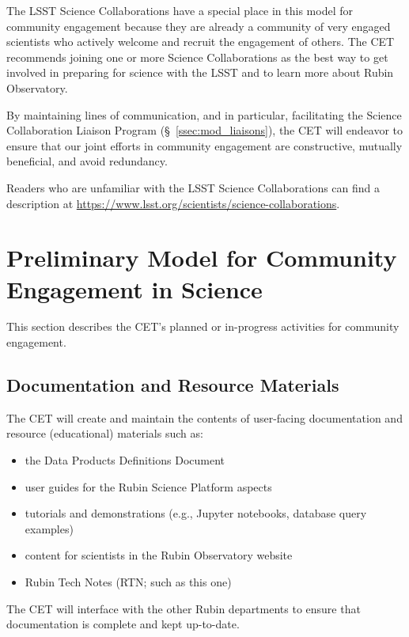 \documentclass[DM,lsstdraft,toc]{lsstdoc}
\begin{document}
The LSST Science Collaborations have a special place in this model for community engagement because they are already a community of very engaged scientists who actively welcome and recruit the engagement of others.
The CET recommends joining one or more Science Collaborations as the best way to get involved in preparing for science with the LSST and to learn more about Rubin Observatory.

By maintaining lines of communication, and in particular, facilitating the Science Collaboration Liaison Program (\S~\ref{ssec:mod_liaisons}), the CET will endeavor to ensure that our joint efforts in community engagement are constructive, mutually beneficial, and avoid redundancy.

Readers who are unfamiliar with the LSST Science Collaborations can find a description at \url{https://www.lsst.org/scientists/science-collaborations}.



\section{Preliminary Model for Community Engagement in Science}\label{sec:mod}

This section describes the CET's planned or in-progress activities for community engagement. 

\subsection{Documentation and Resource Materials}\label{ssec:mod_docs}

The CET will create and maintain the contents of user-facing documentation and resource (educational) materials such as:
\begin{itemize}
\item the Data Products Definitions Document 
\item user guides for the Rubin Science Platform aspects
\item tutorials and demonstrations (e.g., Jupyter notebooks, database query examples)
\item content for scientists in the Rubin Observatory website
\item Rubin Tech Notes (RTN; such as this one)
\end{itemize}

The CET will interface with the other Rubin departments to ensure that documentation is complete and kept up-to-date.
\end{document}
